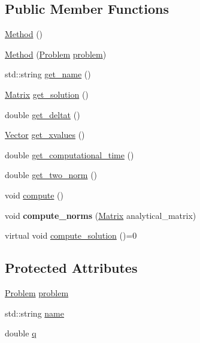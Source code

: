 \subsection*{Public Member Functions}
\begin{DoxyCompactItemize}
\item 
\hyperlink{classMethod_ab48717dc68d3c057b65574a539a480f7}{Method} ()
\item 
\hyperlink{classMethod_ad27fe6ae65cd4571d52cba8562b16222}{Method} (\hyperlink{classProblem}{Problem} \hyperlink{classMethod_a29a08a679b5d30a8c813766308205041}{problem})
\item 
std\+::string \hyperlink{classMethod_a103a9b2dcf6ef35857e279ba1e5ef9c3}{get\+\_\+name} ()
\item 
\hyperlink{classMatrix}{Matrix} \hyperlink{classMethod_a2a10100e81e4aca97f7ef485ed11fbe6}{get\+\_\+solution} ()
\item 
double \hyperlink{classMethod_a45b9b0d41d353381a6725323e5be6281}{get\+\_\+deltat} ()
\item 
\hyperlink{classVector}{Vector} \hyperlink{classMethod_aeda95af3c0440df84c0571614f6fd122}{get\+\_\+xvalues} ()
\item 
double \hyperlink{classMethod_a0ad41fa7e54a46dc97b73187a8dcba4d}{get\+\_\+computational\+\_\+time} ()
\item 
double \hyperlink{classMethod_aa44aa54b2296d6bee9f0ed22f73991ba}{get\+\_\+two\+\_\+norm} ()
\item 
void \hyperlink{classMethod_a50aea9f4e6101bf7c37f145177b72693}{compute} ()
\item 
void {\bfseries compute\+\_\+norms} (\hyperlink{classMatrix}{Matrix} analytical\+\_\+matrix)\hypertarget{classMethod_a4f1d13311599c8ffd73835663beb0e7b}{}\label{classMethod_a4f1d13311599c8ffd73835663beb0e7b}

\item 
virtual void \hyperlink{classMethod_af3dcec8e066214e82d8b4578a4a55076}{compute\+\_\+solution} ()=0
\end{DoxyCompactItemize}
\subsection*{Protected Attributes}
\begin{DoxyCompactItemize}
\item 
\hyperlink{classProblem}{Problem} \hyperlink{classMethod_a29a08a679b5d30a8c813766308205041}{problem}
\item 
std\+::string \hyperlink{classMethod_a8648aeee4e6ebb1adc52522ac26ac523}{name}
\item 
double \hyperlink{classMethod_a794257d62bedf3691c3c0a2b921b8886}{q}
\end{DoxyCompactItemize}


